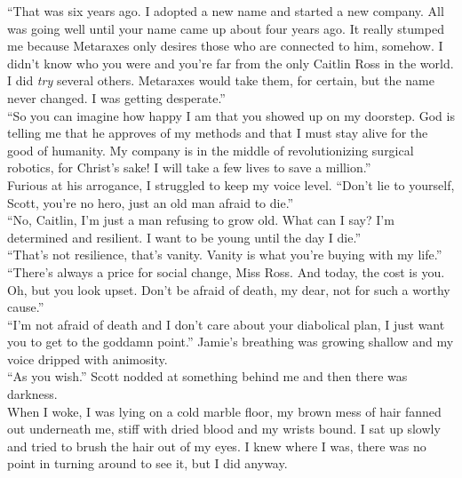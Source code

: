 \documentclass[a5paper]{scrartcl}
\begin{document}
\enquote{That was six years ago. I adopted a new name and started a new company. All was going well until your name came up about four years ago. It really stumped me because Metaraxes only desires those who are connected to him, somehow. I didn't know who you were and you're far from the only Caitlin Ross in the world. I did \textit{try}
 several others. Metaraxes would take them, for certain, but the name never changed. I was getting desperate.}\\


\enquote{So you can imagine how happy I am that you showed up on my doorstep.  God is telling me that he approves of my methods and that I must stay alive for the good of humanity. My company is in the middle of revolutionizing surgical robotics, for Christ's sake! I will take a few lives to save a million.}\\


Furious at his arrogance, I struggled to keep my voice level. \enquote{Don't lie to yourself, Scott, you're no hero, just an old man afraid to die.}\\


\enquote{No, Caitlin, I'm just a man refusing to grow old. What can I say? I'm determined and resilient.  I want to be young until the day I die.}\\


\enquote{That's not resilience, that's vanity. Vanity is what you're buying with my life.} \\


\enquote{There's always a price for social change, Miss Ross. And today, the cost is you. Oh, but you look upset. Don't be afraid of death, my dear, not for such a worthy cause.}\\


\enquote{I'm not afraid of death and I don't care about your diabolical plan, I just want you to get to the goddamn point.} Jamie's breathing was growing shallow and my voice dripped with animosity.\\


\enquote{As you wish.} Scott nodded at something behind me and then there was darkness.\\


When I woke, I was lying on a cold marble floor, my brown mess of hair fanned out underneath me, stiff with dried blood and my wrists bound. I sat up slowly and tried to brush the hair out of my eyes. I knew where I was, there was no point in turning around to see it, but I did anyway.\\
\end{document}
